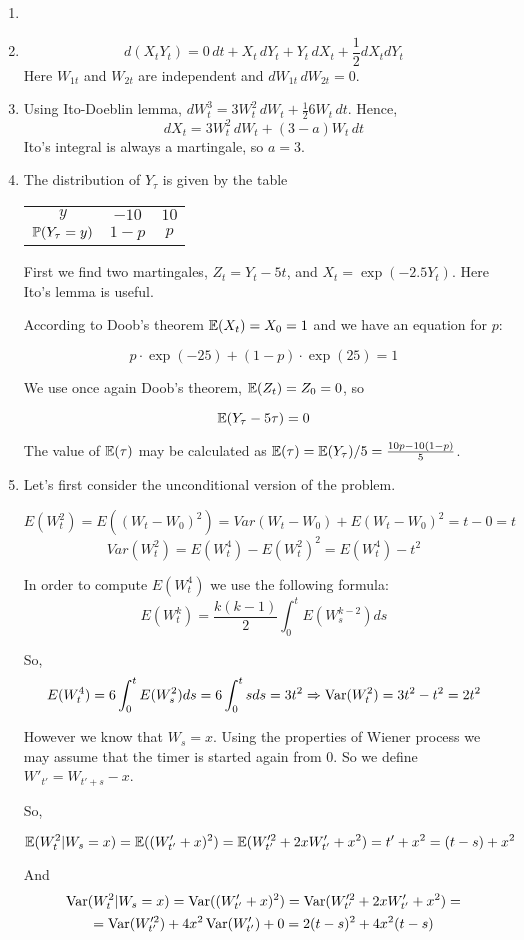\documentclass[12pt, a4paper]{article}
\begin{document}
\begin{enumerate}
\item
\item
\[
d(X_t Y_t)=0\, dt + X_t \, dY_t +Y_t \, dX_t + \frac{1}{2} dX_t dY_t
\]
Here $W_{1t}$ and $W_{2t}$ are independent and $dW_{1t} \, dW_{2t}=0$.


\item Using Ito-Doeblin lemma, $dW_t^3=3W_t^2 \, dW_t + \frac{1}{2}6W_t \, dt$. Hence,
\[
dX_t=3W_t^2 \, dW_t + (3-a)W_t \, dt
\]
Ito's integral is always a martingale, so $a=3$.

\item The distribution of $Y_{\tau}$ is given by the table

\begin{tabular}{ccc}
$y$ & $-10$ & $10$ \\
$\P(Y_{\tau}=y)$ & $1-p$ & $p$ \\
\end{tabular}

First we find two martingales, $Z_t=Y_t-5t$, and $X_t=\exp(-2.5 Y_t)$. Here Ito's lemma is useful.

According to Doob's theorem $\E(X_t)=X_0=1$ and we have an equation for $p$:

\[
p\cdot \exp(-25) + (1-p) \cdot \exp(25) = 1
\]


We use once again Doob's theorem, $\E(Z_t)=Z_0=0$, so

\[
\E(Y_{\tau}-5\tau)=0
\]

The value of $\E(\tau)$ may be calculated as $\E(\tau)=\E(Y_{\tau})/5=\frac{10p-10(1-p)}{5}$.

\item Let's first consider the unconditional version of the problem.

\[
E(W^{2}_t)=E((W_t-W_0)^{2})=Var(W_t-W_0)+E(W_t-W_0)^{2}=t-0=t
\]
\[
Var(W^{2}_t)=E(W^{4}_t)-E(W^{2}_t)^{2}=E(W^{4}_t)-t^2
\]

In order to compute $E(W^{4}_t)$ we use the following formula:
\[
E(W^{k}_t)=\frac{k(k-1)}{2}\int_{0}^{t}E(W^{k-2}_s)ds
\]

So,
\[
E(W^{4}_t)=6\int_{0}^{t}E(W^{2}_s)ds=6\int_{0}^{t}sds=3t^2 \Rightarrow \Var(W^{2}_t)=3t^2-t^2=2t^2
\]

However we know that $W_s=x$. Using the properties of Wiener process we may assume that the timer is started again from $0$. So we define $W'_{t'}=W_{t'+s}-x$.

So,

\[
\E(W_t^2 | W_s=x) = \E( (W'_{t'}+x)^2 )= \E(W^{\prime 2}_{t'}+2xW'_{t'}+x^2)=t'+x^2=(t-s)+x^2
\]

And
\begin{multline}
\Var(W^{2}_t | W_s=x)=\Var((W'_{t'}+x)^2)=\Var(W^{\prime 2}_{t'} +2xW'_{t'}+x^2)= \\
= \Var(W^{\prime 2}_{t'}) +4x^2 \Var(W'_{t'}) + 0 = 2(t-s)^2+4x^2(t-s)
\end{multline}

\end{enumerate}
\end{document}
